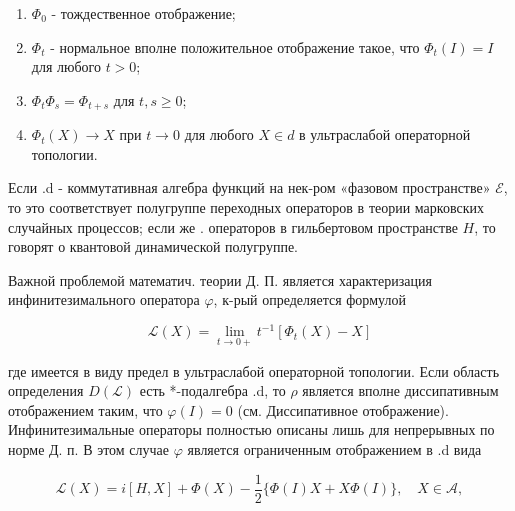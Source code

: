 \documentclass[10pt]{article}
\begin{document}
\begin{enumerate}

  \item $\Phi_{0}$ - тождественное отображение;



  \item $\Phi_{t}$ - нормальное вполне положительное отображение такое, что $\Phi_{t}(I)=I$ для любого $t>0$;



  \item $\Phi_{t} \Phi_{s}=\Phi_{t+s}$ для $t, s \geqslant 0$;



  \item $\Phi_{t}(X) \rightarrow X$ при $t \rightarrow 0$ для любого $X \in d$ в ультраслабой операторной топологии.



\end{enumerate}



Если .d - коммутативная алгебра функций на нек-ром «фазовом пространстве» $\mathscr{E}$, то это соответствует полугруппе переходных операторов в теории марковских случайных процессов; если же . операторов в гильбертовом пространстве $H$, то говорят о квантовой динамической полугруппе.



Важной проблемой математич. теории Д. П. является характеризация инфинитезимального оператора $\mathscr{\varphi}$, к-рый определяется формулой



\[

\mathscr{L}(X)=\lim _{t \rightarrow 0+} t^{-1}\left[\Phi_{t}(X)-X\right]

\]



где имеется в виду предел в ультраслабой операторной топологии. Если область определения $D(\mathscr{L})$ есть *-подалгебра .d, то $\mathscr{\rho}$ является вполне диссипативным отображением таким, что $\varphi(I)=0$ (см. Диссипативное отображение). Инфинитезимальные операторы полностью описаны лишь для непрерывных по норме Д. п. В этом случае $\varphi$ является ограниченным отображением в .d вида



\[

\mathscr{L}(X)=i[H, X]+\Phi(X)-\frac{1}{2}\{\Phi(I) X+X \Phi(I)\}, \quad X \in \mathscr{A},

\]
\end{document}
